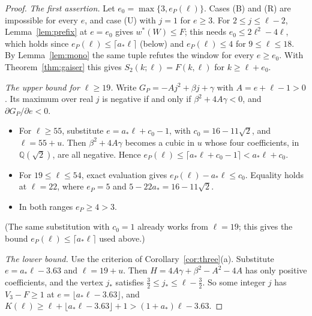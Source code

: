 \documentclass[11pt]{amsart}
\theoremstyle{definition}
\newcommand{\F}{F}
\newcommand{\Stwo}{S_2}
\begin{document}
\begin{proof}
\emph{The first assertion.} Let $e_0=\max\{3,e_P(\ell)\}$. Cases (B) and (R) are impossible for every $e$, and case (U) with $j=1$ for $e\ge3$. For $2\le j\le\ell-2$, Lemma~\ref{lem:prefix} at $e=e_0$ gives $w^*(W)\le\F$; this needs $e_0\le2\ell^2-4\ell$, which holds since $e_P(\ell)\le\lceil a_*\ell\rceil$ (below) and $e_P(\ell)\le4$ for $9\le\ell\le18$. By Lemma~\ref{lem:mono} the same tuple refutes the window for every $e\ge e_0$. With Theorem~\ref{thm:gaiser} this gives $\Stwo(k;\ell)=\F(k,\ell)$ for $k\ge\ell+e_0$.

\emph{The upper bound for $\ell\ge19$.} Write $G_P=-Aj^2+\beta j+\gamma$ with $A=e+\ell-1>0$. Its maximum over real $j$ is negative if and only if $\beta^2+4A\gamma<0$, and $\partial G_P/\partial e<0$.
\begin{itemize}
\item For $\ell\ge55$, substitute $e=a_*\ell+c_0-1$, with $c_0=16-11\sqrt2$, and $\ell=55+u$. Then $\beta^2+4A\gamma$ becomes a cubic in $u$ whose four coefficients, in $\mathbb Q(\sqrt2)$, are all negative. Hence $e_P(\ell)\le\lceil a_*\ell+c_0-1\rceil<a_*\ell+c_0$.
\item For $19\le\ell\le54$, exact evaluation gives $e_P(\ell)-a_*\ell\le c_0$. Equality holds at $\ell=22$, where $e_P=5$ and $5-22a_*=16-11\sqrt2$.
\item In both ranges $e_P\ge4>3$.
\end{itemize}
(The same substitution with $c_0=1$ already works from $\ell=19$; this gives the bound $e_P(\ell)\le\lceil a_*\ell\rceil$ used above.)

\emph{The lower bound.} Use the criterion of Corollary~\ref{cor:three}(a). Substitute $e=a_*\ell-3.63$ and $\ell=19+u$. Then $H=4A\gamma+\beta^2-A^2-4A$ has only positive coefficients, and the vertex $j_*$ satisfies $\frac32\le j_*\le\ell-\frac32$. So some integer $j$ has $V_3-\F\ge1$ at $e=\lfloor a_*\ell-3.63\rfloor$, and $K(\ell)\ge\ell+\lfloor a_*\ell-3.63\rfloor+1>(1+a_*)\ell-3.63$.
\end{proof}
\end{document}

